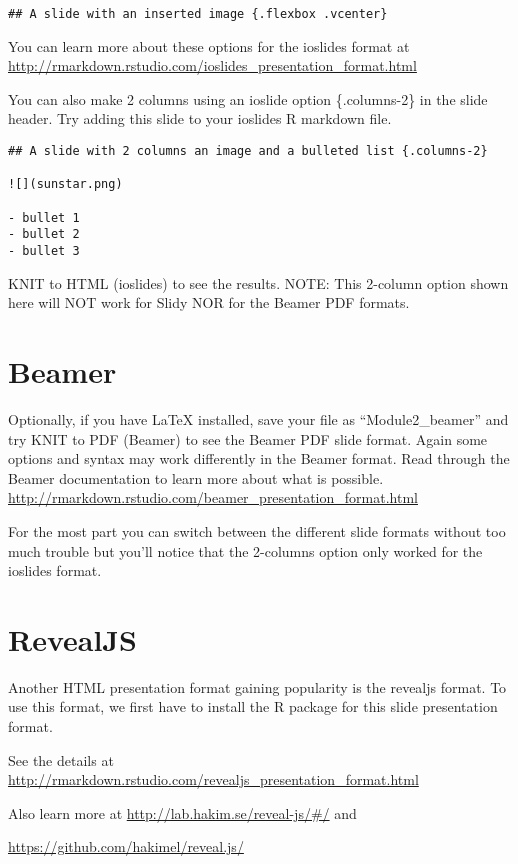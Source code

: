 \documentclass[
]{book}
\begin{document}
\texttt{\#\#\ A\ slide\ with\ an\ inserted\ image\ \{.flexbox\ .vcenter\}}

You can learn more about these options for the ioslides format at \url{http://rmarkdown.rstudio.com/ioslides_presentation_format.html}

You can also make 2 columns using an ioslide option \{.columns-2\} in the slide header. Try adding this slide to your ioslides R markdown file.

\begin{verbatim}
## A slide with 2 columns an image and a bulleted list {.columns-2}

![](sunstar.png)

- bullet 1
- bullet 2
- bullet 3
\end{verbatim}

KNIT to HTML (ioslides) to see the results. NOTE: This 2-column option shown here will NOT work for Slidy NOR for the Beamer PDF formats.

\hypertarget{beamer}{%
\section{Beamer}\label{beamer}}

Optionally, if you have LaTeX installed, save your file as ``Module2\_beamer'' and try KNIT to PDF (Beamer) to see the Beamer PDF slide format. Again some options and syntax may work differently in the Beamer format. Read through the Beamer documentation to learn more about what is possible. \url{http://rmarkdown.rstudio.com/beamer_presentation_format.html}

For the most part you can switch between the different slide formats without too much trouble but you'll notice that the 2-columns option only worked for the ioslides format.

\hypertarget{revealjs}{%
\section{RevealJS}\label{revealjs}}

Another HTML presentation format gaining popularity is the revealjs format. To use this format, we first have to install the R package for this slide presentation format.

See the details at \url{http://rmarkdown.rstudio.com/revealjs_presentation_format.html}

Also learn more at
\url{http://lab.hakim.se/reveal-js/\#/} and

\url{https://github.com/hakimel/reveal.js/}
\end{document}
